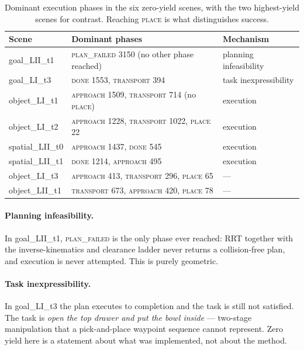 \documentclass[a4paper,11pt]{report}
\begin{document}
\begin{table}[htbp]
\centering
\caption{Dominant execution phases in the six zero-yield scenes, with the two highest-yield scenes
  for contrast. Reaching \textsc{place} is what distinguishes success.}
\label{tab:planner_phases}
\footnotesize
\begin{tabular}{lll}
\toprule
\textbf{Scene} & \textbf{Dominant phases} & \textbf{Mechanism} \\
\midrule
goal\_LII\_t1     & \textsc{plan\_failed} 3150 (no other phase reached) & planning infeasibility \\
goal\_LI\_t3      & \textsc{done} 1553, \textsc{transport} 394          & task inexpressibility \\
object\_LI\_t1    & \textsc{approach} 1509, \textsc{transport} 714 (no \textsc{place}) & execution \\
object\_LI\_t2    & \textsc{approach} 1228, \textsc{transport} 1022, \textsc{place} 22 & execution \\
spatial\_LII\_t0  & \textsc{approach} 1437, \textsc{done} 545           & execution \\
spatial\_LII\_t1  & \textsc{done} 1214, \textsc{approach} 495           & execution \\
\midrule
object\_LI\_t3    & \textsc{approach} 413, \textsc{transport} 296, \textsc{place} 65 & --- \\
object\_LII\_t1   & \textsc{transport} 673, \textsc{approach} 420, \textsc{place} 78 & --- \\
\bottomrule
\end{tabular}
\end{table}

\paragraph{Planning infeasibility.}
In goal\_LII\_t1, \textsc{plan\_failed} is the only phase ever reached: RRT together with the
inverse-kinematics and clearance ladder never returns a collision-free plan, and execution is never
attempted. This is purely geometric.

\paragraph{Task inexpressibility.}
In goal\_LI\_t3 the plan executes to completion and the task is still not satisfied. The task is
\emph{open the top drawer and put the bowl inside} --- two-stage manipulation that a pick-and-place
waypoint sequence cannot represent. Zero yield here is a statement about what was implemented, not
about the method.
\end{document}
